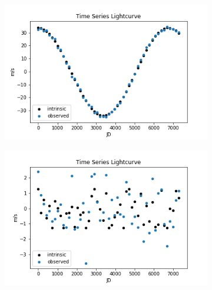 \documentclass[12pt,manuscript]{aastex}
\begin{document}
\begin{figure}[ht]
  \centering
  
  \begin{subfigure}[b]{.45\linewidth}
  \includegraphics[width=\linewidth]{../figures/long_P_no_fold}
  \end{subfigure}
  \begin{subfigure}[b]{.45\linewidth}
  \includegraphics[width=\linewidth]{../figures/short_P_no_fold}
  \end{subfigure}
  

\end{figure}
\end{document}
